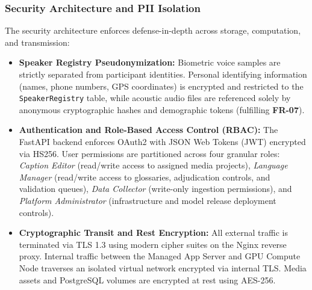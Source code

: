 \documentclass[a4paper,11pt]{article}
\begin{document}
\subsubsection{Security Architecture and PII Isolation}
\label{sec:chap3_gov_security}
The security architecture enforces defense-in-depth across storage, computation, and transmission:
\begin{itemize}
    \item \textbf{Speaker Registry Pseudonymization:} Biometric voice samples are strictly separated from participant identities. Personal identifying information (names, phone numbers, GPS coordinates) is encrypted and restricted to the \texttt{SpeakerRegistry} table, while acoustic audio files are referenced solely by anonymous cryptographic hashes and demographic tokens (fulfilling \textbf{FR-07}).
    \item \textbf{Authentication and Role-Based Access Control (RBAC):} The FastAPI backend enforces OAuth2 with JSON Web Tokens (JWT) encrypted via HS256. User permissions are partitioned across four granular roles: \textit{Caption Editor} (read/write access to assigned media projects), \textit{Language Manager} (read/write access to glossaries, adjudication controls, and validation queues), \textit{Data Collector} (write-only ingestion permissions), and \textit{Platform Administrator} (infrastructure and model release deployment controls).
    \item \textbf{Cryptographic Transit and Rest Encryption:} All external traffic is terminated via TLS 1.3 using modern cipher suites on the Nginx reverse proxy. Internal traffic between the Managed App Server and GPU Compute Node traverses an isolated virtual network encrypted via internal TLS. Media assets and PostgreSQL volumes are encrypted at rest using AES-256.
\end{itemize}
\end{document}
